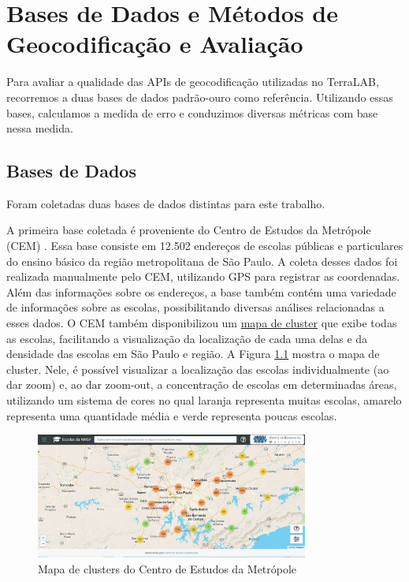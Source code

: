 \chapter{Bases de Dados e Métodos de Geocodificação e Avaliação} \label{desenvolvimento}

Para avaliar a qualidade das APIs de geocodificação utilizadas no TerraLAB, recorremos a duas bases de dados padrão-ouro como referência. Utilizando essas bases, calculamos a medida de erro e conduzimos diversas métricas com base nessa medida.

\section{Bases de Dados}
Foram coletadas duas bases de dados distintas para este trabalho.

A primeira base coletada é proveniente do Centro de Estudos da Metrópole (CEM) \cite{cem}. Essa base consiste em 12.502 endereços de escolas públicas e particulares do ensino básico da região metropolitana de São Paulo. A coleta desses dados foi realizada manualmente pelo CEM, utilizando GPS para registrar as coordenadas. Além das informações sobre os endereços, a base também contém uma variedade de informações sobre as escolas, possibilitando diversas análises relacionadas a esses dados. O CEM também disponibilizou um \href{http://200.144.244.241:3002/geolocation}{mapa de cluster} que exibe todas as escolas, facilitando a visualização da localização de cada uma delas e da densidade das escolas em São Paulo e região. A Figura \ref{fig:siteCEM} mostra o mapa de cluster. Nele, é possível visualizar a localização das escolas individualmente (ao dar zoom) e, ao dar zoom-out, a concentração de escolas em determinadas áreas, utilizando um sistema de cores no qual laranja representa muitas escolas, amarelo representa uma quantidade média e verde representa poucas escolas. 

\begin{figure} 
    \centering
    \includegraphics[width=0.8\textwidth]{Figuras/siteCEM.jpeg}
    \caption{Mapa de clusters do Centro de Estudos da Metrópole}
    \label{fig:siteCEM}
\end{figure}

